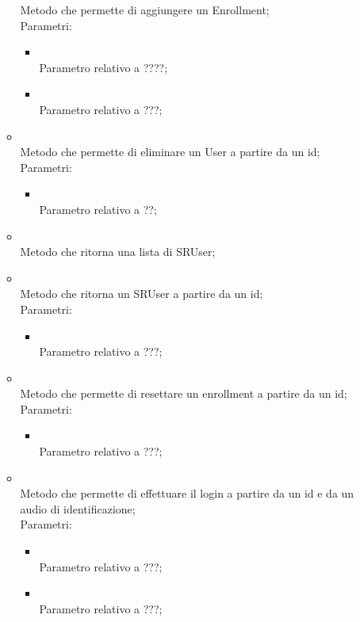 \begin{itemize}
\begin{itemize}
		Metodo che permette di aggiungere un Enrollment;\\
		Parametri:
		\begin{itemize}
			\item {} \\
			Parametro relativo a ????;
			\item {} \\
			Parametro relativo a ???;
		\end{itemize}
		\item[]  \\
		Metodo che permette di eliminare un User a partire da un id;\\
		Parametri:
		\begin{itemize}
			\item {} \\
			Parametro relativo a ??;
		\end{itemize}
		\item[]  \\
		Metodo che ritorna una lista di SRUser;\\
		\item[]  \\
		Metodo che ritorna un SRUser a partire da un id;\\
		Parametri:
		\begin{itemize}
			\item {} \\
			Parametro relativo a ???;
		\end{itemize}
		\item[]  \\
		Metodo che permette di resettare un enrollment a partire da un id;\\
		Parametri:
		\begin{itemize}
			\item {} \\
			Parametro relativo a ???;
		\end{itemize}
		\item[]  \\
		Metodo che permette di effettuare il login a partire da un id e da un audio di identificazione;\\
		Parametri:
		\begin{itemize}
			\item {} \\
			Parametro relativo a ???;
			\item {} \\
			Parametro relativo a ???;
		\end{itemize}
	\end{itemize}
\end{itemize}

